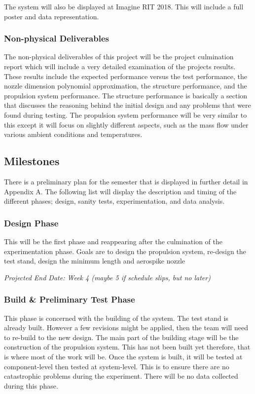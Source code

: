 \documentclass[conference]{IEEEtran} %
\begin{document}
The system will also be displayed at Imagine RIT 2018. This will include a full poster and data representation.

\subsubsection{Non-physical Deliverables}
\label{subsubsec: non-physical deliverables}

The non-physical deliverables of this project will be the project culmination report which will include a very detailed examination of the projects
results. These results include the expected performance versus the test performance, the nozzle dimension polynomial approximation, the structure performance, and the
propulsion system performance. The structure performance is basically a section that discusses the reasoning behind the initial design and any problems
that were found during testing. The propulsion system performance will be very similar to this except it will focus on slightly different aspects, such as
the mass flow under various ambient conditions and temperatures.

\subsection{Milestones}
\label{subsec:milestones}

There is a preliminary plan for the semester that is displayed in further detail in Appendix A. The following list will display the description and timing
of the different phases; design, sanity tests, experimentation, and data analysis.

\subsubsection{Design Phase}
\label{subsubsec: design phase}
    This will be the first phase and reappearing after the culmination of the experimentation phase.
    Goals are to design the propulsion system, re-design the test stand, design the minimum length and aerospike nozzle

    \textit{Projected End Date: Week 4 (maybe 5 if schedule slips, but no later)}

\subsubsection{Build \& Preliminary Test Phase}
\label{subsubsec: sanity test phase}
    This phase is concerned with the building of the system. The test stand is already built. However a few revisions might be applied, then the team will need
    to re-build to the new design. The main part of the building stage will be the construction of the propulsion system. This has not been built yet therefore, that
    is where most of the work will be. Once the system is built, it will be tested at component-level then tested at system-level. This is to ensure there are no catastrophic
    problems during the experiment. There will be no data collected during this phase.
\end{document}
